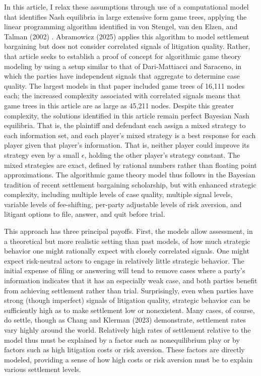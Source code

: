 \documentclass{article}
\begin{document}
In this article, I relax these assumptions through use of a computational model that identifies Nash equilibria in large extensive form game trees, applying the linear programming algorithm identified in von Stengel, van den Elzen, and Talman (2002) \cite{vonstengelvandenelzentalman}. Abramowicz (2025) applies this algorithm to model settlement bargaining but does not consider correlated signals of litigation quality. Rather, that article seeks to establish a proof of concept for algorithmic game theory modeling by using a setup similar to that of Dari-Mattiacci and Saraceno, in which the parties have independent signals that aggregate to determine case quality. The largest models in that paper included game trees of 16,111 nodes each; the increased complexity associated with correlated signals means that game trees in this article are as large as 45,211 nodes. Despite this greater complexity, the solutions identified in this article remain perfect Bayesian Nash equilibria. That is, the plaintiff and defendant each assign a mixed strategy to each information set, and each player's mixed strategy is a best response for each player given that player's information. That is, neither player could improve its strategy even by a small $\epsilon$, holding the other player's strategy constant. The mixed strategies are exact, defined by rational numbers rather than floating point approximations. The algorithmic game theory model thus follows in the Bayesian tradition of recent settlement bargaining scholarship, but with enhanced strategic complexity, including multiple levels of case quality, multiple signal levels, variable levels of fee-shifting, per-party adjustable levels of risk aversion, and litigant options to file, answer, and quit before trial. 

This approach has three principal payoffs. First, the models allow assessment, in a theoretical but more realistic setting than past models, of how much strategic behavior one might rationally expect with closely correlated signals. One might expect risk-neutral actors to engage in relatively little strategic behavior. The initial expense of filing or answering will tend to remove cases where a party's information indicates that it has an especially weak case, and both parties benefit from achieving settlement rather than trial. Surprisingly, even when parties have strong (though imperfect) signals of litigation quality, strategic behavior can be sufficiently high as to make settlement low or nonexistent. Many cases, of course, do settle, though as Chang and Klerman (2023) \cite{changklerman} demonstrate, settlement rates vary highly around the world. Relatively high rates of settlement relative to the model thus must be explained by a factor such as nonequilibrium play or by factors such as high litigation costs or risk aversion. These factors are directly modeled, providing a sense of how high costs or risk aversion must be to explain various settlement levels.
\end{document}
